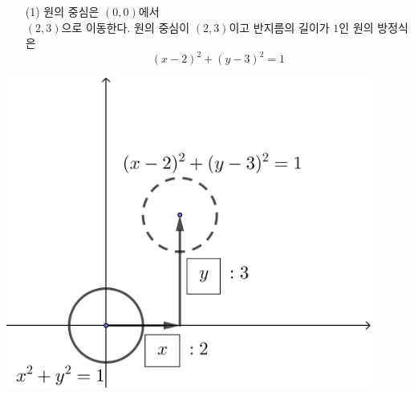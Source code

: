 \documentclass{oblivoir}
\begin{document}
\begin{mdframed}\begin{minipage}{0.49\textwidth}
\begin{enumerate}[topsep=0pt]
\item[(1)]
원의 중심은 \((0,0)\)에서\\
\((2,3)\)으로 이동한다.
원의 중심이 \((2,3)\)이고 반지름의 길이가 \(1\)인 원의 방정식은
\[(x-2)^2+(y-3)^2=1\]
\end{enumerate}
\end{minipage}
\begin{minipage}{0.49\textwidth}
\begin{center}
\includegraphics[width=0.9\textwidth]{ttranslate_2-1}
\end{center}
\end{minipage}\end{mdframed}
\end{document}
